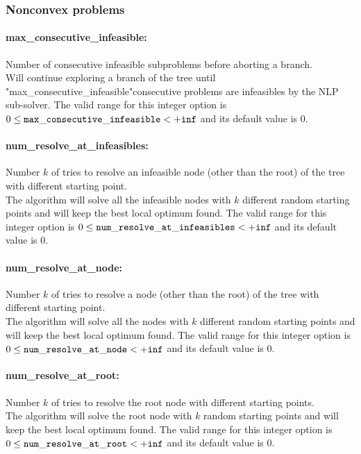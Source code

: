 \subsubsection{Nonconvex problems}
\label{sec:Nonconvex_problems}

\paragraph{max\_consecutive\_infeasible:}\label{sec:max_consecutive_infeasible} Number of consecutive infeasible subproblems before aborting a branch. $\;$ \\
 Will continue exploring a branch of the tree
until "max\_consecutive\_infeasible"consecutive
problems are infeasibles by the NLP sub-solver. The valid range for this integer option is
$0 \le {\tt max\_consecutive\_infeasible } <  {\tt +inf}$
and its default value is $0$.


\paragraph{num\_resolve\_at\_infeasibles:}\label{sec:num_resolve_at_infeasibles} Number $k$ of tries to resolve an infeasible node (other than the root) of the tree with different starting point. $\;$ \\
 The algorithm will solve all the infeasible nodes
with $k$ different random starting points and
will keep the best local optimum found. The valid range for this integer option is
$0 \le {\tt num\_resolve\_at\_infeasibles } <  {\tt +inf}$
and its default value is $0$.


\paragraph{num\_resolve\_at\_node:}\label{sec:num_resolve_at_node} Number $k$ of tries to resolve a node (other than the root) of the tree with different starting point. $\;$ \\
 The algorithm will solve all the nodes with $k$
different random starting points and will keep
the best local optimum found. The valid range for this integer option is
$0 \le {\tt num\_resolve\_at\_node } <  {\tt +inf}$
and its default value is $0$.


\paragraph{num\_resolve\_at\_root:}\label{sec:num_resolve_at_root} Number $k$ of tries to resolve the root node with different starting points. $\;$ \\
 The algorithm will solve the root node with $k$
random starting points and will keep the best
local optimum found. The valid range for this integer option is
$0 \le {\tt num\_resolve\_at\_root } <  {\tt +inf}$
and its default value is $0$.


